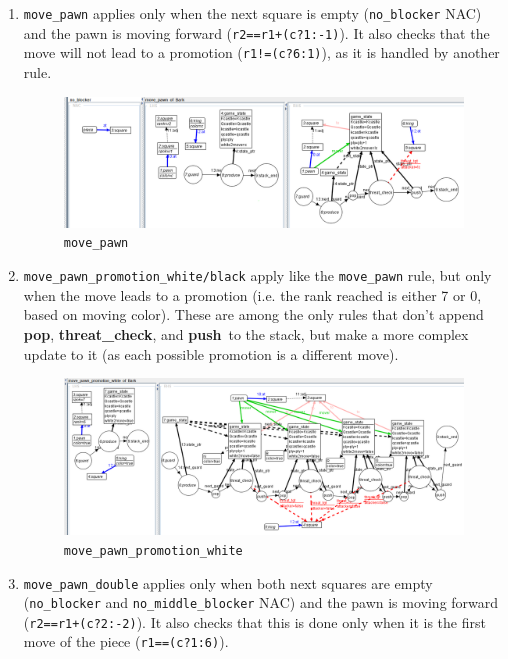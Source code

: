 \documentclass[a4paper, 10pt]{scrartcl}
\newcommand{\noderepr}[1]{\textsf{\textbf{#1}}}
\newcommand{\push}{\noderepr{push}}
\newcommand{\pop}{\noderepr{pop}}
\newcommand{\threatcheck}{\noderepr{threat\_check}}
\begin{document}
    \begin{enumerate}
        \item \texttt{move\_pawn} applies only when the next square is empty (\texttt{no\_blocker} NAC) and the pawn is moving forward (\texttt{r2==r1+(c?1:-1)}). It also checks that the move will not lead to a promotion (\texttt{r1!=(c?6:1)}), as it is handled by another rule.
        \begin{figure}[H]
            \centering
            \includegraphics[width=.8\linewidth]{images/move_pawn.png}
            \caption{\texttt{move\_pawn}}
        \end{figure}
        \item \texttt{move\_pawn\_promotion\_white/black} apply like the \texttt{move\_pawn} rule, but only when the move leads to a promotion (i.e. the rank reached is either 7 or 0, based on moving color). These are among the only rules that don't append \pop, \threatcheck, and \push\ to the stack, but make a more complex update to it (as each possible promotion is a different move).
        \begin{figure}[H]
            \centering
            \includegraphics[width=.8\linewidth]{images/move_pawn_promotion_white.png}
            \caption{\texttt{move\_pawn\_promotion\_white}}
        \end{figure}
        \item \texttt{move\_pawn\_double} applies only when both next squares are empty (\texttt{no\_blocker} and \texttt{no\_middle\_blocker} NAC) and the pawn is moving forward (\texttt{r2==r1+(c?2:-2)}). It also checks that this is done only when it is the first move of the piece (\texttt{r1==(c?1:6)}).
        \begin{figure}[H]

\end{figure}
\end{enumerate}
\end{document}
